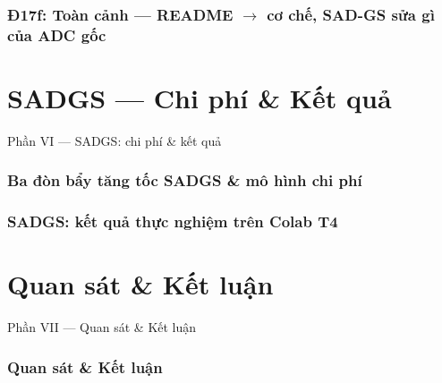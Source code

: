 \section{Đ17f: Toàn cảnh --- README $\to$ cơ chế, SAD-GS sửa gì của ADC gốc}


\part{SADGS --- Chi phí \& Kết quả}
\begin{frame}{Phần VI --- SADGS: chi phí \& kết quả}
\small
\tableofcontents
\end{frame}

\section{Ba đòn bẩy tăng tốc SADGS \& mô hình chi phí}


\section{SADGS: kết quả thực nghiệm trên Colab T4}


\part{Quan sát \& Kết luận}
\begin{frame}{Phần VII --- Quan sát \& Kết luận}
\small
\tableofcontents
\end{frame}

\section{Quan sát \& Kết luận}

